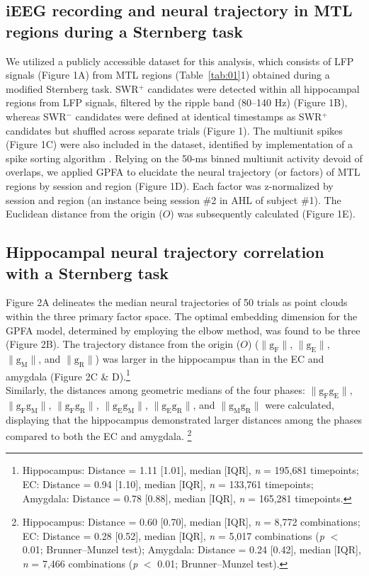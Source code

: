 \documentclass[final,3p,times,twocolumn]{elsarticle}
\newcommand{\REDSTARTS}{\color{red}}
\newcommand{\GREENENDS}{\color{black}}
\begin{document}
\begin{abstract\GREENENDS \REDSTARTS ll_Tables}
\subsection{iEEG recording and neural trajectory in MTL regions during a Sternberg task}
We utilized a publicly accessible dataset \cite{boran_dataset_2020} for this analysis, which consists of LFP signals (Figure 1A) from MTL regions (Table~\ref{tab:01}1) obtained during a modified Sternberg task. SWR$^+$ candidates were detected within all hippocampal regions from LFP signals, filtered by the ripple band (80--140 Hz) (Figure 1B), whereas SWR$^-$ candidates were defined at identical timestamps as SWR$^+$ candidates but shuffled across separate trials (Figure 1). The multiunit spikes (Figure 1C) were also included in the dataset, identified by implementation of a spike sorting algorithm \cite{niediek_reliable_2016}. Relying on the 50-ms binned multiunit activity devoid of overlaps, we applied GPFA \cite{yu_gaussian-process_2009} to elucidate the neural trajectory (or factors) of MTL regions by session and region (Figure 1D). Each factor was z-normalized by session and region (an instance being session \#2 in AHL of subject \#1). The Euclidean distance from the origin ($O$) was subsequently calculated (Figure 1E).

\subsection{Hippocampal neural trajectory correlation with a Sternberg task}
Figure 2A delineates the median neural trajectories of 50 trials as point clouds within the three primary factor space. The optimal embedding dimension for the GPFA model, determined by employing the elbow method, was found to be three (Figure 2B). The trajectory distance from the origin ($O$) ($\mathrm{\lVert g_{F} \rVert}$, $\mathrm{\lVert g_{E} \rVert}$, $\mathrm{\lVert g_{M} \rVert}$, and $\mathrm{\lVert g_{R} \rVert}$) was larger in the hippocampus than in the EC and amygdala (Figure 2C \& D).\footnote{Hippocampus: Distance = 1.11 [1.01], median [IQR], \textit{n} = 195,681 timepoints; EC: Distance = 0.94 [1.10], median [IQR], \textit{n} = 133,761 timepoints; Amygdala: Distance = 0.78 [0.88], median [IQR], \textit{n} = 165,281 timepoints.}
\\
\indent
Similarly, the distances among geometric medians of the four phases: $\mathrm{\lVert g_{F}g_{E} \rVert}$, $\mathrm{\lVert g_{F}g_{M} \rVert}$, $\mathrm{\lVert g_{F}g_{R} \rVert}$, $\mathrm{\lVert g_{E}g_{M} \rVert}$, $\mathrm{\lVert g_{E}g_{R} \rVert}$, and $\mathrm{\lVert g_{M}g_{R} \rVert}$ were calculated, displaying that the hippocampus demonstrated larger distances among the phases compared to both the EC and amygdala. \footnote{Hippocampus: Distance = 0.60 [0.70], median [IQR], \textit{n} = 8,772 combinations; EC: Distance = 0.28 [0.52], median [IQR], \textit{n} = 5,017 combinations (\textit{p} $<$ 0.01; Brunner--Munzel test); Amygdala: Distance = 0.24 [0.42], median [IQR], \textit{n} = 7,466 combinations (\textit{p} $<$ 0.01; Brunner--Munzel test).}


\end{abstract\GREENENDS \REDSTARTS ll_Tables}
\end{document}
